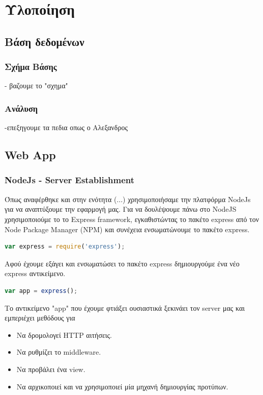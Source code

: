 \graphicspath{ {Figures/implementation/} }

\chapter{Υλοποίηση}\label{ch:Implementation}




\section{Βάση δεδομένων}
	\subsection{Σχήμα Βάσης}
	- βαζουμε το "σχημα"
	\subsection{Ανάλυση}
	-επεξηγουμε τα πεδια οπως ο Αλεξανδρος


\section{Web App}
	\subsection{NodeJs - Server Establishment}
	
	Όπως αναφέρθηκε και στην ενότητα (...) χρησιμοποιήσαμε την πλατφόρμα NodeJs για να αναπτύξουμε την εφαρμογή μας. Για να δουλέψουμε πάνω στο NodeJS χρησιμοποιούμε το το Express framework, εγκαθιστώντας το πακέτο express από τον Node Package Manager (NPM) και συνέχεια ενσωματώνουμε το πακέτο express. 
	
		\begin{lstlisting}[language=Javascript]	
	  		var express = require('express');
		\end{lstlisting}
		
		
	Αφού έχουμε εξάγει και ενσωματώσει το πακέτο express δημιουργούμε ένα νέο express αντικείμενο.	
		
		
		\begin{lstlisting}[language=Javascript]	
			var app = express(); 	
 		\end{lstlisting}
		
			Το αντικείμενο "app" που έχουμε φτιάξει ουσιαστικά ξεκινάει τον server μας και εμπεριέχει μεθόδους για 
			\begin{itemize}
			\item Να δρομολογεί HTTP αιτήσεις.
			\item Να ρυθμίζει το middleware.
			\item Να προβάλει ένα view.
			\item Να αρχικοποιεί και να χρησιμοποιεί μία μηχανή δημιουργίας προτύπων.
			\end{itemize}
				

